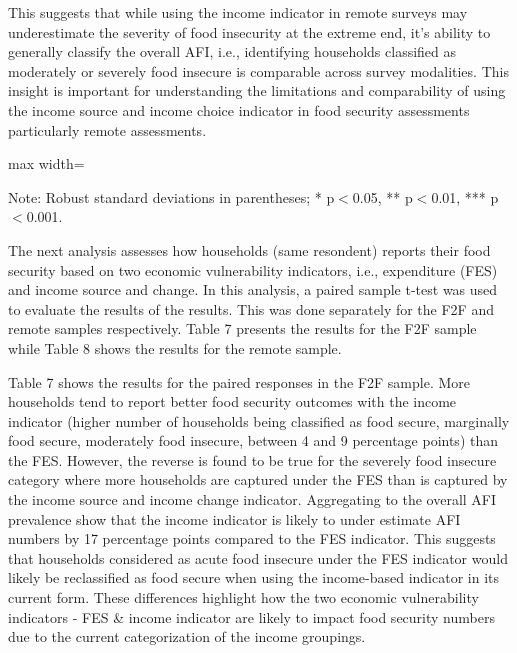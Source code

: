 \documentclass[11pt,harvard]{article}
\begin{document}
	This suggests that while using the income indicator in remote surveys may underestimate the severity of food insecurity at the extreme end, it's ability to generally classify the overall AFI, i.e., identifying households classified as moderately or severely food insecure is comparable across survey modalities. 
	This insight is important for understanding the limitations and comparability of using the income source and income choice indicator in food security assessments particularly remote assessments.
	
	\begin{table}[htbp]
		\centering
		\begin{adjustbox}{max width=\textwidth}
			\begin{threeparttable}
				\caption{Impact of Survey Modality: CARI-Inc vs. rCARI-Inc}
				\scriptsize
				 
				\label{tab:Inc_CARI_rCARI_Modality_BF}
				\begin{tablenotes}
					\item Note: Robust standard deviations in parentheses; * p$<$0.05, ** p$<$0.01, *** p$<$0.001. 
				\end{tablenotes}
			\end{threeparttable}
		\end{adjustbox}
	\end{table}
	
	The next analysis assesses how households (same resondent) reports their food security based on two economic vulnerability indicators, i.e., expenditure (FES) and income source and change. In this analysis, a paired sample t-test was used to evaluate the results of the results. This was done separately for the F2F and remote samples respectively. Table 7 presents the results for the F2F sample while Table 8 shows the results for the remote sample.
	
	Table 7 shows the results for the paired responses in the F2F sample. More households tend to report better food security outcomes with the income indicator (higher number  of households being classified as food secure, marginally food secure, moderately food insecure, between 4 and 9 percentage points) than the FES. However, the reverse is found to be true for the severely food insecure category where more households are captured under the FES than is captured by the income source and income change indicator. Aggregating to the overall AFI prevalence show that the income indicator is likely to under estimate AFI numbers by 17 percentage points compared to the FES indicator. This suggests that households considered as acute food insecure under the FES indicator would likely be reclassified as food secure when using the income-based indicator in its current form. These differences highlight how the two economic vulnerability indicators - FES \& income indicator are likely to impact food security numbers due to the current categorization of the income groupings.
	
\end{document}

